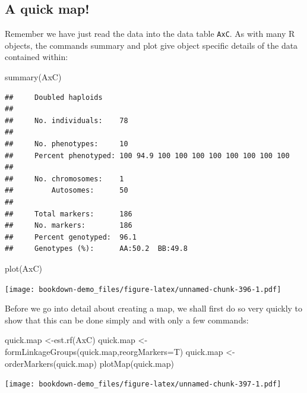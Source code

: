 \documentclass[
]{book}
\newenvironment{Shaded}{\begin{snugshade}}{\end{snugshade}}
\newcommand{\AttributeTok}[1]{\textcolor[rgb]{0.77,0.63,0.00}{#1}}
\newcommand{\FunctionTok}[1]{\textcolor[rgb]{0.00,0.00,0.00}{#1}}
\newcommand{\NormalTok}[1]{#1}
\newcommand{\OtherTok}[1]{\textcolor[rgb]{0.56,0.35,0.01}{#1}}
\begin{document}
\hypertarget{a-quick-map}{%
\subsection{A quick map!}\label{a-quick-map}}

Remember we have just read the data into the data table \texttt{AxC}. As with many R objects, the commands summary and plot give object specific details of the data contained within:

\begin{Shaded}
\begin{Highlighting}[]
\FunctionTok{summary}\NormalTok{(AxC) }
\end{Highlighting}
\end{Shaded}

\begin{verbatim}
##     Doubled haploids
## 
##     No. individuals:    78 
## 
##     No. phenotypes:     10 
##     Percent phenotyped: 100 94.9 100 100 100 100 100 100 100 100 
## 
##     No. chromosomes:    1 
##         Autosomes:      50 
## 
##     Total markers:      186 
##     No. markers:        186 
##     Percent genotyped:  96.1 
##     Genotypes (%):      AA:50.2  BB:49.8
\end{verbatim}

\begin{Shaded}
\begin{Highlighting}[]
\FunctionTok{plot}\NormalTok{(AxC)}
\end{Highlighting}
\end{Shaded}

\texttt{[image: bookdown-demo\_files/figure-latex/unnamed-chunk-396-1.pdf]}

Before we go into detail about creating a map, we shall first do so very quickly to show that this can be done simply and with only a few commands:

\begin{Shaded}
\begin{Highlighting}[]
\NormalTok{quick.map }\OtherTok{\textless{}{-}}\FunctionTok{est.rf}\NormalTok{(AxC) }
\NormalTok{quick.map }\OtherTok{\textless{}{-}}\FunctionTok{formLinkageGroups}\NormalTok{(quick.map,}\AttributeTok{reorgMarkers=}\NormalTok{T) }
\NormalTok{quick.map }\OtherTok{\textless{}{-}}\FunctionTok{orderMarkers}\NormalTok{(quick.map)}
\FunctionTok{plotMap}\NormalTok{(quick.map)  }
\end{Highlighting}
\end{Shaded}

\texttt{[image: bookdown-demo\_files/figure-latex/unnamed-chunk-397-1.pdf]}
\end{document}
